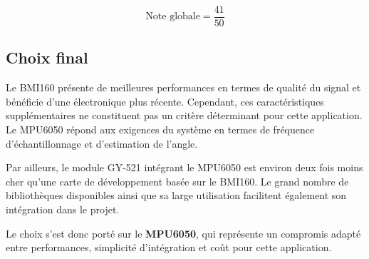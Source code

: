$$
\text{Note globale}=\frac{41}{50}
$$
\subsection{Choix final}

Le BMI160 présente de meilleures performances en termes de qualité du signal et bénéficie d'une électronique plus récente. Cependant, ces caractéristiques supplémentaires ne constituent pas un critère déterminant pour cette application. Le MPU6050 répond aux exigences du système en termes de fréquence d'échantillonnage et d'estimation de l'angle.

Par ailleurs, le module GY-521 intégrant le MPU6050 est environ deux fois moins cher qu'une carte de développement basée sur le BMI160. Le grand nombre de bibliothèques disponibles ainsi que sa large utilisation facilitent également son intégration dans le projet.

Le choix s'est donc porté sur le \textbf{MPU6050}, qui représente un compromis adapté entre performances, simplicité d'intégration et coût pour cette application.